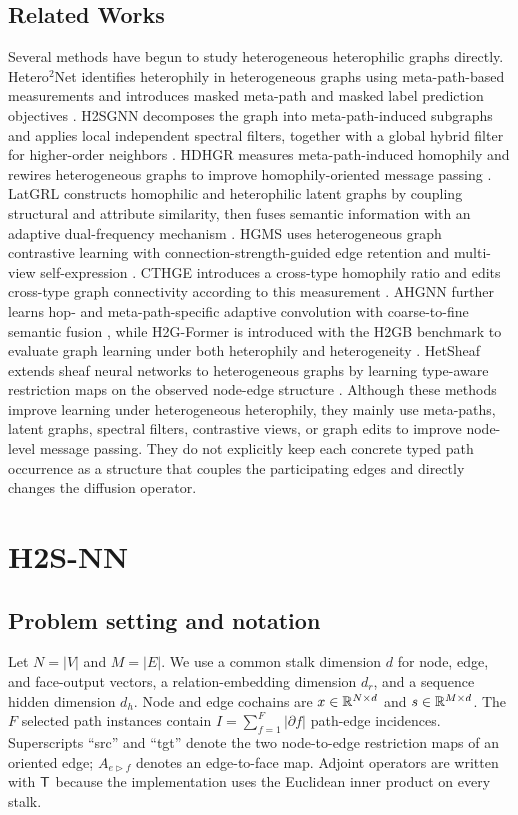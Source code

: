 \subsection{Related Works}
Several methods have begun to study heterogeneous heterophilic graphs directly. 
Hetero$^2$Net identifies heterophily in heterogeneous graphs using meta-path-based measurements and introduces masked meta-path and masked label prediction objectives \cite{li2023hetero2net}. 
H2SGNN decomposes the graph into meta-path-induced subgraphs and applies local independent spectral filters, together with a global hybrid filter for higher-order neighbors \cite{lu2024h2sgnn}. 
HDHGR measures meta-path-induced homophily and rewires heterogeneous graphs to improve homophily-oriented message passing \cite{guo2023hdhgr}. 
LatGRL constructs homophilic and heterophilic latent graphs by coupling structural and attribute similarity, then fuses semantic information with an adaptive dual-frequency mechanism \cite{shen2024latgrl}. 
HGMS uses heterogeneous graph contrastive learning with connection-strength-guided edge retention and multi-view self-expression \cite{wang2025hgms}. 
CTHGE introduces a cross-type homophily ratio and edits cross-type graph connectivity according to this measurement \cite{tao2025cthge}. 
AHGNN further learns hop- and meta-path-specific adaptive convolution with coarse-to-fine semantic fusion \cite{chen2025ahgnn}, while H2G-Former is introduced with the H2GB benchmark to evaluate graph learning under both heterophily and heterogeneity \cite{lin2024h2gb}. 
HetSheaf extends sheaf neural networks to heterogeneous graphs by learning type-aware restriction maps on the observed node-edge structure \cite{braithwaite2024hetsheaf}.
Although these methods improve learning under heterogeneous heterophily, they mainly use meta-paths, latent graphs, spectral filters, contrastive views, or graph edits to improve node-level message passing. 
They do not explicitly keep each concrete typed path occurrence as a structure that couples the participating edges and directly changes the diffusion operator.
\section{H2S-NN}
\label{sec:method}

\subsection{Problem setting and notation}

Let $N=|V|$ and $M=|E|$. We use a common stalk dimension $d$ for node, edge, and
face-output vectors, a relation-embedding dimension $d_r$, and a sequence hidden dimension $d_h$.
Node and edge cochains are $x\in\mathbb{R}^{N\times d}$ and $s\in\mathbb{R}^{M\times d}$. The $F$ selected path
instances contain $I=\sum_{f=1}^{F}|\partial f|$ path-edge incidences. Superscripts ``src'' and
``tgt'' denote the two node-to-edge restriction maps of an oriented edge;
$A_{e\triangleright f}$ denotes an edge-to-face map. Adjoint operators are written with
$\mathsf{T}$ because the implementation uses the Euclidean inner product on every stalk.

